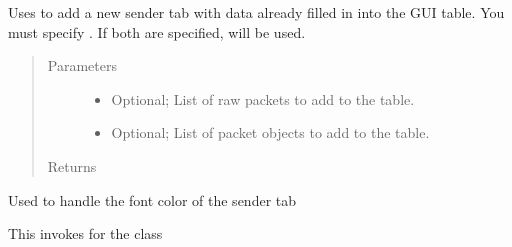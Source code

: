 \documentclass[letterpaper,10pt,english]{sphinxmanual}
\begin{document}
\begin{fulllineitems}
\begin{fulllineitems}
\label{\detokenize{src:src.SenderTab.SenderTab.addSenderWithData}}
Uses {\hyperref[\detokenize{src:src.SenderTab.SenderTab.addSender}]{}} to add a new sender tab with data already filled in into the GUI table.
You must specify   . If both are specified,
 will be used.
\begin{quote}\begin{description}
\item[{Parameters}] \leavevmode\begin{itemize}
\item {} 
 \textendash{} Optional; List of raw packets to add to the table.

\item {} 
 \textendash{} Optional; List of packet objects to add to the table.

\end{itemize}

\item[{Returns}] \leavevmode


\end{description}\end{quote}

\end{fulllineitems}


\begin{fulllineitems}
\label{\detokenize{src:src.SenderTab.SenderTab.currentlySendingTabs}}
Used to handle the font color of the sender tab

\end{fulllineitems}


\begin{fulllineitems}
\label{\detokenize{src:src.SenderTab.SenderTab.handleInterfaceSettingsDialog}}
This invokes  for the class


\end{fulllineitems}
\end{fulllineitems}
\end{document}

